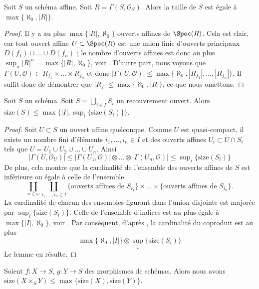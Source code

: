\begin{lemma}
\label{lemma-bound-affine}
Soit $S$ un schéma affine. Soit $R = \Gamma(S, \mathcal{O}_S)$. Alors la taille
de $S$ est égale à $\max\{ \aleph_0, |R|\}$.
\end{lemma}

\begin{proof}
Il y a au plus $\max\{|R|, \aleph_0\}$ ouverts affines de $\Spec(R)$. Cela est
clair, car tout ouvert affine $U \subset \Spec(R)$ est une union finie
d'ouverts principaux $D(f_1) \cup \ldots \cup D(f_n)$ ; le nombre d'ouverts
affines est donc au plus
$\sup_n |R|^n = \max\{|R|, \aleph_0\}$, voir
\cite[chap. I, 10.13]{Kunen}. D'autre part, nous voyons que
$\Gamma(U, \mathcal{O}) \subset R_{f_1} \times \ldots \times R_{f_n}$ et donc
$|\Gamma(U, \mathcal{O})| \leq
\max\{\aleph_0, |R_{f_1}|, \ldots, |R_{f_n}|\}$. Il suffit donc de démontrer
que $|R_f| \leq \max\{\aleph_0, |R|\}$, ce que nous omettons.
\end{proof}

\begin{lemma}
\label{lemma-bound-size}
Soit $S$ un schéma. Soit $S = \bigcup_{i \in I} S_i$ un recouvrement ouvert.
Alors
$\text{size}(S) \leq \max\{|I|, \sup_i\{\text{size}(S_i)\}\}$.
\end{lemma}

\begin{proof}
Soit $U \subset S$ un ouvert affine quelconque. Comme $U$ est quasi-compact,
il existe un nombre fini d'éléments $i_1, \ldots, i_n \in I$ et des ouverts
affines $U_i \subset U \cap S_i$ tels que
$U = U_1 \cup U_2 \cup \ldots \cup U_n$. Ainsi
$$
|\Gamma(U, \mathcal{O}_U)|
\leq
|\Gamma(U_1, \mathcal{O})|
\otimes
\ldots
\otimes
|\Gamma(U_n, \mathcal{O})|
\leq \sup\nolimits_i\{\text{size}(S_i)\}
$$
De plus, cela montre que la cardinalité de l'ensemble des ouverts affines de
$S$ est inférieure ou égale à celle de l'ensemble
$$
\coprod_{n \in \omega}
\coprod_{i_1, \ldots, i_n \in I}
\{\text{ouverts affines de }S_{i_1}\}
\times
\ldots
\times
\{\text{ouverts affines de }S_{i_n}\}.
$$
La cardinalité de chacun des ensembles figurant dans l'union disjointe est
majorée par $\sup_i\{\text{size}(S_i)\}$. Celle de l'ensemble d'indices est
au plus égale à $\max\{|I|, \aleph_0\}$, voir
\cite[chap. I, 10.13]{Kunen}. Par conséquent, d'après
\cite[lemme 5.8]{Jech}, la cardinalité du coproduit est au plus
$$
\max\{\aleph_0, |I|\}
\otimes \sup_i\{\text{size}(S_i)\}
$$
Le lemme en résulte.
\end{proof}

\begin{lemma}
\label{lemma-bound-size-fibre-product}
Soient $f : X \to S$, $g : Y \to S$ des morphismes de schémas. Alors nous
avons
$\text{size}(X \times_S Y) \leq \max\{\text{size}(X), \text{size}(Y)\}$.
\end{lemma}

